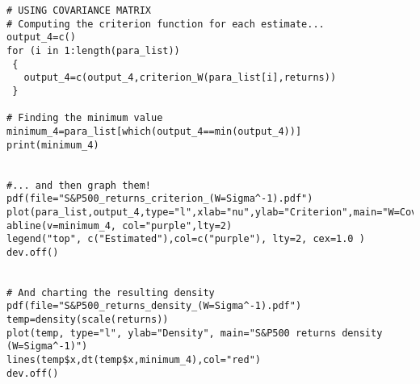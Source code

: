\begin{appendices}
\begin{verbatim}
# USING COVARIANCE MATRIX
# Computing the criterion function for each estimate...
output_4=c()
for (i in 1:length(para_list))
 {
   output_4=c(output_4,criterion_W(para_list[i],returns))
 }
       
# Finding the minimum value
minimum_4=para_list[which(output_4==min(output_4))]
print(minimum_4)


#... and then graph them!
pdf(file="S&P500_returns_criterion_(W=Sigma^-1).pdf")
plot(para_list,output_4,type="l",xlab="nu",ylab="Criterion",main="W=Cov(x)")
abline(v=minimum_4, col="purple",lty=2)
legend("top", c("Estimated"),col=c("purple"), lty=2, cex=1.0 )
dev.off()


# And charting the resulting density
pdf(file="S&P500_returns_density_(W=Sigma^-1).pdf")
temp=density(scale(returns))
plot(temp, type="l", ylab="Density", main="S&P500 returns density (W=Sigma^-1)")
lines(temp$x,dt(temp$x,minimum_4),col="red")       
dev.off()

\end{verbatim}
\end{appendices}
